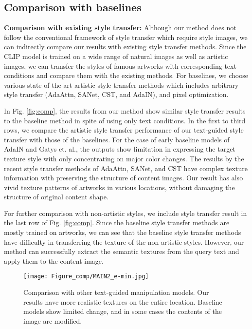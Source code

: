 \documentclass[10pt,twocolumn,letterpaper]{article}
\begin{document}
\subsection{Comparison with baselines}
\noindent\textbf{Comparison with existing style transfer:}
Although our method does not follow the conventional framework of style transfer which require style images, we can indirectly compare our results with existing style transfer methods. Since the CLIP model is trained on a wide range of natural images as well as artistic images, we can transfer the styles of famous artworks with corresponding text conditions and compare them with the existing methods. For baselines, we choose various state-of-the-art artistic style transfer methods which includes arbitrary style transfer (AdaAttn\cite{liu}, SANet\cite{park}, CST\cite{svoboda}, and AdaIN\cite{adain}), and pixel optimization\cite{gatys}.

In Fig. \ref{fig:comp}, the results from our method show similar style transfer results to the baseline method in spite of using only text conditions. In the first to third rows, we compare the artistic style transfer performance of our text-guided style transfer with those of the baselines. For the case of early baseline models of AdaIN\cite{adain} and Gatys et. al.\cite{gatys}, the outputs  show limitation in expressing the target texture style with only concentrating on major color changes. The results by the recent style transfer methods of AdaAttn\cite{liu}, SANet\cite{park}, and CST\cite{svoboda}
have complex texture information with preserving the structure of content images. Our result has also vivid texture patterns of artworks in various locations, without damaging the structure of original content shape. 

 For further comparison with non-artistic styles, we include style transfer result in the last row of Fig. \ref{fig:comp}. Since the baseline style transfer methods are mostly trained on artworks, we can see that the baseline style transfer methods have difficulty in transferring the texture of the non-artistic styles. However, our method can successfully extract the semantic textures from the query text and apply them to the content image.

\begin{figure}[!t]
\centering
    \vspace*{-0.5cm}
  \texttt{[image: Figure\_comp/MAIN2\_e-min.jpg]}
  \vspace*{-0.5cm}
\caption{Comparison with other text-guided manipulation models. Our results have more realistic textures on the entire location. Baseline models show limited change, and in some cases the contents of the image are  modified.}
\label{fig:comp_text}
\end{figure}
\end{document}
